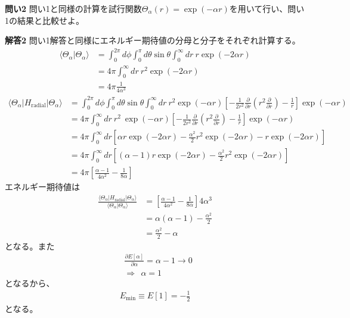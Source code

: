 \documentclass[11pt,pra,aps]{revtex4}
\begin{document}
\noindent
{\bf 問い2} 問い1と同様の計算を試行関数$\Theta_\alpha(r)=\exp(-\alpha r)$を用いて行い、問い1の結果と比較せよ。

\noindent
{\bf 解答2}
問い1解答と同様にエネルギー期待値の分母と分子をそれぞれ計算する。
\begin{align}
  \langle\Theta_\alpha|\Theta_\alpha\rangle&=\int_0^{2\pi}d\phi\int_0^\pi d\theta\sin\theta\int_0^\infty dr \ r \exp(-2\alpha r) \nonumber \\ 
  &=4\pi\int_0^\infty dr \ r^2 \exp(-2\alpha r) \nonumber \\
  &=4\pi\frac{1}{4\alpha^3}
\end{align}
\begin{align}
  \langle\Theta_\alpha|H_\text{radial}|\Theta_\alpha\rangle&=\int_0^{2\pi}d\phi\int_0^\pi d\theta\sin\theta\int_0^\infty dr \ r^2 \exp(-\alpha r) \left[ -\frac{1}{2r^2}\frac{\partial}{\partial r}\left(r^2 \frac{\partial}{\partial r}\right) - \frac{1}{r} \right]\exp(-\alpha r)\nonumber \\
  &=4\pi\int_0^\infty dr \ r^2 \ \exp(-\alpha r) \left[ -\frac{1}{2r^2}\frac{\partial}{\partial r}\left(r^2 \frac{\partial}{\partial r}\right) - \frac{1}{r} \right]\exp(-\alpha r)\nonumber \\
  &=4\pi\int_0^\infty dr \left[ \alpha r\exp(-2\alpha r) -\frac{\alpha^2}{2}r^2\exp(-2\alpha r)-r \exp(-2\alpha r) \right] \nonumber \\
  &=4\pi\int_0^\infty dr \left[ (\alpha-1) r\exp(-2\alpha r) -\frac{\alpha^2}{2}r^2\exp(-2\alpha r) \right] \nonumber \\
  &=4\pi\left[ \frac{\alpha-1}{4\alpha^2} - \frac{1}{8\alpha} \right]
\end{align}
エネルギー期待値は
\begin{align}
  \frac{\langle\Theta_\alpha|H_\text{radial}|\Theta_\alpha\rangle}{\langle\Theta_\alpha|\Theta_\alpha\rangle}&=\left[ \frac{\alpha-1}{4\alpha^2} - \frac{1}{8\alpha} \right]{4\alpha^3} \nonumber \\
  &=\alpha(\alpha-1) - \frac{\alpha^2}{2} \nonumber \\
  &=\frac{\alpha^2}{2}-\alpha
\end{align}
となる。また
\begin{align}
  &\frac{\partial E[\alpha]}{\partial\alpha}=\alpha-1\rightarrow 0 \nonumber \\
  &\Rightarrow \ \ \alpha=1 \label{eq:alpha-slater}
\end{align}
となるから、
\begin{align}
  E_\text{min}\equiv E\left[1\right]=-\frac{1}{2}
\end{align}
となる。
\end{document}

